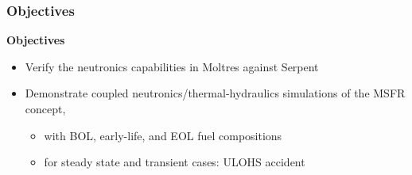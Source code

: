 \begin{frame}
	\frametitle{Objectives}
		\textbf{Objectives}
		\begin{itemize}
			\item Verify the neutronics capabilities in Moltres against Serpent
			\item Demonstrate coupled neutronics/thermal-hydraulics simulations
			of the \gls{MSFR} concept,
			\begin{itemize}
				\item with \gls{BOL}, early-life, and \gls{EOL} fuel compositions
				\item for steady state and transient cases: \gls{ULOHS} accident
			\end{itemize}
		\end{itemize}
\end{frame}